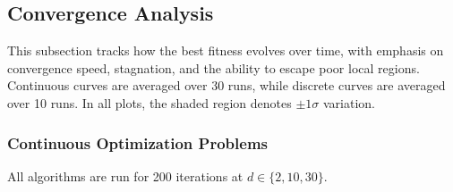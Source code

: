 \subsection{Convergence Analysis}

This subsection tracks how the best fitness evolves over time, with emphasis on convergence speed, stagnation, and the ability to escape poor local regions. Continuous curves are averaged over 30 runs, while discrete curves are averaged over 10 runs. In all plots, the shaded region denotes $\pm 1\sigma$ variation.


\subsubsection{Continuous Optimization Problems}

All algorithms are run for 200 iterations at $d\in\{2,10,30\}$.

